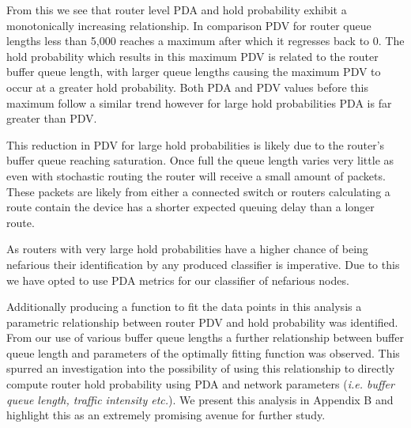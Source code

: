   From this we see that router level PDA and hold probability exhibit a monotonically increasing relationship. In comparison PDV for router queue lengths less than 5,000 reaches a maximum  after which it regresses back to 0. The hold probability which results in this maximum PDV is related to the router buffer queue length, with larger queue lengths causing the maximum PDV to occur at a greater hold probability. Both PDA and PDV values before this maximum follow a similar trend however for large hold probabilities PDA is far greater than PDV.\par
  This reduction in PDV for large hold probabilities is likely due to the router's buffer queue reaching saturation. Once full the queue length varies very little as even with stochastic routing the router will receive a small amount of packets. These packets are likely from either a connected switch or routers calculating a route contain the device has a shorter expected queuing delay than a longer route.\par
  As routers with very large hold probabilities have a higher chance of being nefarious their identification by any produced classifier is imperative. Due to this we have opted to use PDA metrics for our classifier of nefarious nodes.\par
  Additionally producing a function to fit the data points in this analysis a parametric relationship between router PDV and hold probability was identified. From our use of various buffer queue lengths a further relationship between buffer queue length and parameters of the optimally fitting function was observed. This spurred an investigation into the possibility of using this relationship to directly compute router hold probability using PDA and network parameters (\textit{i.e. buffer queue length, traffic intensity etc.}). We present this analysis in Appendix B and highlight this as an extremely promising avenue for further study.

